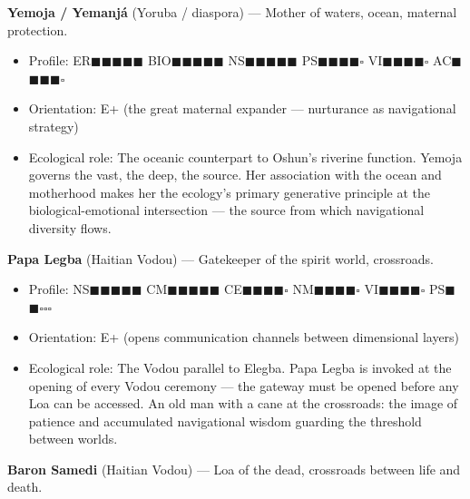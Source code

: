 \textbf{Yemoja / Yemanjá} (Yoruba / diaspora) — Mother of waters, ocean, maternal protection.

\begin{itemize}[nosep,leftmargin=*]
  \item Profile: ER$\blacksquare$$\blacksquare$$\blacksquare$$\blacksquare$$\blacksquare$ BIO$\blacksquare$$\blacksquare$$\blacksquare$$\blacksquare$$\blacksquare$ NS$\blacksquare$$\blacksquare$$\blacksquare$$\blacksquare$$\blacksquare$ PS$\blacksquare$$\blacksquare$$\blacksquare$$\blacksquare$$\square$ VI$\blacksquare$$\blacksquare$$\blacksquare$$\blacksquare$$\square$ AC$\blacksquare$$\blacksquare$$\blacksquare$$\blacksquare$$\square$
  \item Orientation: E+ (the great maternal expander — nurturance as navigational strategy)
  \item Ecological role: The oceanic counterpart to Oshun's riverine function. Yemoja governs the vast, the deep, the source. Her association with the ocean and motherhood makes her the ecology's primary generative principle at the biological-emotional intersection — the source from which navigational diversity flows.
\end{itemize}


\textbf{Papa Legba} (Haitian Vodou) — Gatekeeper of the spirit world, crossroads.

\begin{itemize}[nosep,leftmargin=*]
  \item Profile: NS$\blacksquare$$\blacksquare$$\blacksquare$$\blacksquare$$\blacksquare$ CM$\blacksquare$$\blacksquare$$\blacksquare$$\blacksquare$$\blacksquare$ CE$\blacksquare$$\blacksquare$$\blacksquare$$\blacksquare$$\square$ NM$\blacksquare$$\blacksquare$$\blacksquare$$\blacksquare$$\square$ VI$\blacksquare$$\blacksquare$$\blacksquare$$\blacksquare$$\square$ PS$\blacksquare$$\blacksquare$$\square$$\square$$\square$
  \item Orientation: E+ (opens communication channels between dimensional layers)
  \item Ecological role: The Vodou parallel to Elegba. Papa Legba is invoked at the opening of every Vodou ceremony — the gateway must be opened before any Loa can be accessed. An old man with a cane at the crossroads: the image of patience and accumulated navigational wisdom guarding the threshold between worlds.
\end{itemize}


\textbf{Baron Samedi} (Haitian Vodou) — Loa of the dead, crossroads between life and death.

